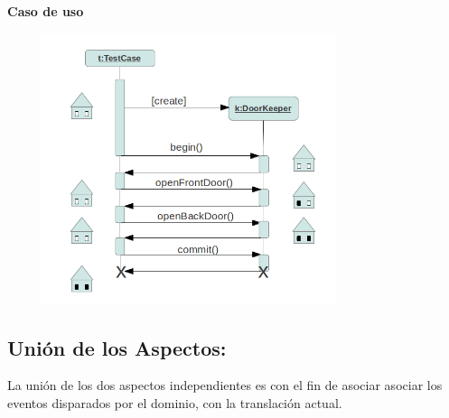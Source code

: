 	{\bf Caso de uso}
	
	\includegraphics[width=400px, height=300px]{img/tescasePOT}
	
\subsection{Unión de los Aspectos:}
\label{sec:Union}
La unión de los dos aspectos independientes es con el fin de asociar asociar los
eventos disparados por el dominio, con la translación actual.
 
